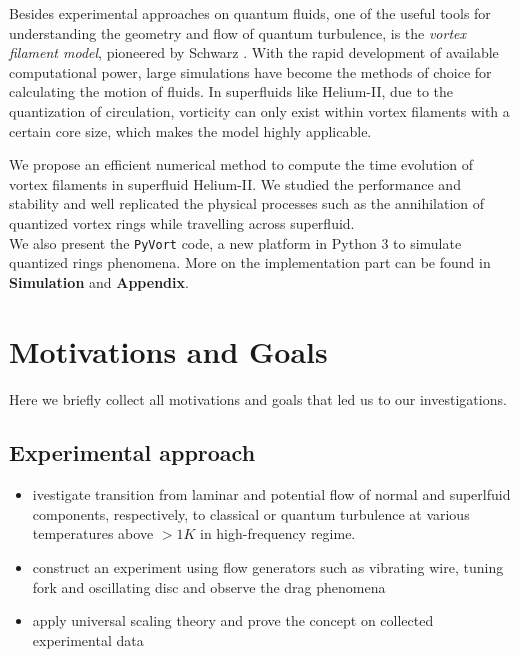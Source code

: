 	Besides experimental approaches on quantum fluids, one of the useful tools for understanding the geometry and flow of quantum turbulence, is the \textit{vortex filament model}, pioneered by Schwarz \cite{schwarz}. With the rapid development of available computational power, large simulations have become the methods of choice for calculating the motion of fluids. In superfluids like Helium-II, due to the quantization of circulation, vorticity can only exist within vortex filaments with a certain core size, which makes the model highly applicable.

	We propose an efficient numerical method to compute the time evolution of vortex filaments in superfluid Helium-II. We studied the performance and stability and well replicated the physical processes such as the annihilation of quantized vortex rings \cite{vortex_ring} while travelling across superfluid.\\
	We also present the \texttt{PyVort} code, a new platform in Python 3 to simulate quantized rings phenomena. More on the implementation part can be found in \textbf{Simulation} and \textbf{Appendix}.


	\section*{Motivations and Goals}

	Here we briefly collect all motivations and goals that led us to our investigations.

	\subsection*{Experimental approach}

	\begin{itemize}
		\item ivestigate transition from laminar and potential flow of normal and superlfuid components, respectively, to classical or quantum turbulence at various temperatures above $>1\unit{K}$ in high-frequency regime.
		\item construct an experiment using flow generators such as vibrating wire, tuning fork and oscillating disc and observe the drag phenomena
		\item apply universal scaling theory and prove the concept on collected experimental data
	\end{itemize}

